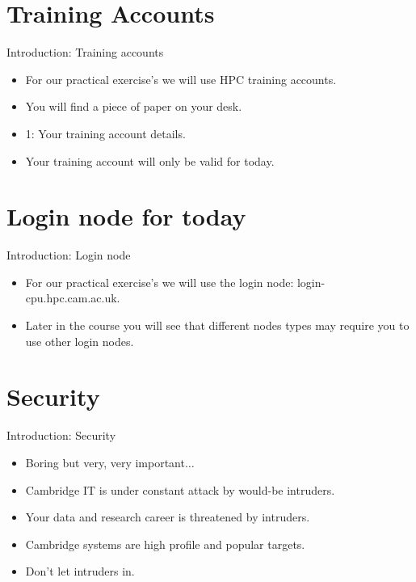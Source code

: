 \section{Training Accounts}
\begin{frame}{Introduction: Training accounts}
\begin{itemize}
\item{\alert{For our practical exercise's we will use HPC training accounts.}}
\pause
\item{You will find a piece of paper on your desk.}
\pause
\item{1: Your training account details.}
\pause
\item{Your training account will only be valid for today.}
\end{itemize}
\end{frame}

\section{Login node for today}
\begin{frame}{Introduction: Login node}
\begin{itemize}
\item{\alert{For our practical exercise's we will use the login node: login-cpu.hpc.cam.ac.uk.}}
\pause
\item{Later in the course you will see that different nodes types may require you to use other login nodes.}
\end{itemize}
\end{frame}

\section{Security}
\begin{frame}{Introduction: Security}
\begin{itemize}
\item{\alert{Boring but very, very important${}\ldots$}}
\pause
\item{Cambridge IT is under constant attack by would-be intruders.}
\pause
\item{Your data and research career is threatened by intruders.}
\pause
\item{\alert{Cambridge systems} are high profile and popular targets.}
\pause
\item{\alert{Don't let intruders in.}}
\end{itemize}
\end{frame}

